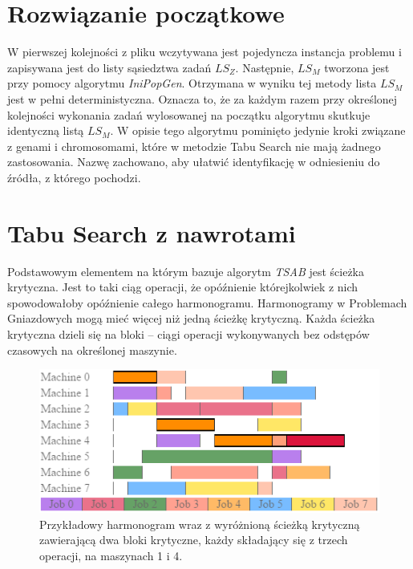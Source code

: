 \documentclass[archivemode]{mgr}
\begin{document}
\section{Rozwiązanie początkowe}
W pierwszej kolejności z pliku wczytywana jest pojedyncza instancja problemu i zapisywana jest do listy sąsiedztwa zadań $LS_Z$. Następnie, $LS_M$ tworzona jest przy pomocy algorytmu \emph{IniPopGen}. Otrzymana w wyniku tej metody lista $LS_M$ jest w pełni deterministyczna. Oznacza to, że za każdym razem przy określonej kolejności wykonania zadań wylosowanej na początku algorytmu skutkuje identyczną listą $LS_M$. W opisie tego algorytmu pominięto jedynie kroki związane z genami i chromosomami, które w metodzie Tabu Search nie mają żadnego zastosowania. Nazwę zachowano, aby ułatwić identyfikację w odniesieniu do źródła, z którego pochodzi.
%
\section{Tabu Search z nawrotami}
Podstawowym elementem na którym bazuje algorytm \emph{TSAB} jest ścieżka krytyczna. Jest to taki ciąg operacji, że opóźnienie którejkolwiek z nich spowodowałoby opóźnienie całego harmonogramu. Harmonogramy w Problemach Gniazdowych mogą mieć więcej niż jedną ścieżkę krytyczną. Każda ścieżka krytyczna dzieli się na bloki \cite{Grabowski86} -- ciągi operacji wykonywanych bez odstępów czasowych na określonej maszynie.
\begin{figure}[!ht]
\begin{center}
\includegraphics[scale=1.0]{rysunki/criticalPath2.png}
\caption[Przykładowy harmonogram wraz z wyróżnioną ścieżką krytyczną]{Przykładowy harmonogram wraz z wyróżnioną ścieżką krytyczną zawierającą dwa bloki krytyczne, każdy składający się z trzech operacji, na maszynach 1 i 4.}
\label{rys_critical_path_example}
\end{center}
\end{figure}
%
\end{document}
